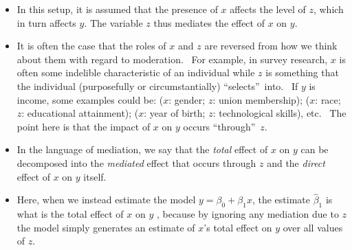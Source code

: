 \documentclass[11pt]{article}
\begin{document}
\begin{itemize}
\item In this setup, it is assumed that the presence of $x$ affects the
level of $z$, which in turn affects $y$. The variable $z$ thus mediates the
effect of $x$ on $y$.\ 

\item It is often the case that the roles of $x$ and $z$ are reversed from
how we think about them with regard to moderation. \ For example, in survey
research, $x$ is often some indelible characteristic of an individual while $%
z$ is something that the individual (purposefully or circumstantially)
\textquotedblleft selects\textquotedblright\ into. \ If $y$ is income, some
examples could be: ($x$: gender; $z$: union membership); ($x$: race; $z$:
educational attainment); ($x$: year of birth; $z$: technological skills),
etc. \ The point here is that the impact of $x$ on $y$ occurs
\textquotedblleft through\textquotedblright\ $z$. \ 

\item In the language of mediation, we say that the \textit{total }effect of 
$x$ on $y$ can be decomposed into the \textit{mediated }effect that occurs
through $z$ and the \textit{direct }effect of $x$ on $y$ itself.

\item Here, when we instead estimate the model $y=\beta _{0}+\beta _{1}x$,
the estimate $\widehat{\beta }_{1}$ is what is the total effect of $x$ on $y$%
, because by ignoring any mediation due to $z$ the model simply generates an
estimate of $x$'s total effect on $y$ over all values of $z$.
\end{itemize}
\end{document}
